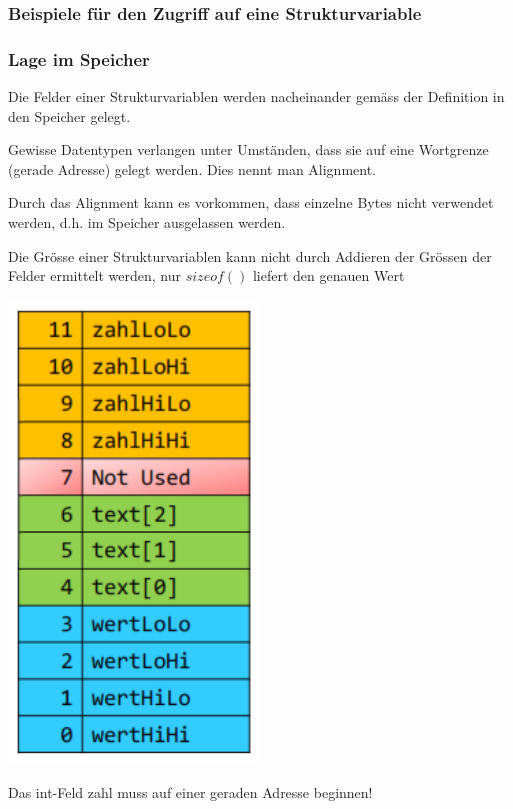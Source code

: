 		\subsubsection{Beispiele für den Zugriff auf eine Strukturvariable}
			\vspace*{-0.2cm}
			
			\vspace*{0.3cm}
		\begin{minipage}[c]{8 cm}
			\subsubsection{Lage im Speicher}
				\begin{compactitem}
					\item Die Felder einer Strukturvariablen werden nacheinander gemäss der Definition in den Speicher gelegt.
					\item Gewisse Datentypen verlangen unter Umständen, dass sie auf eine Wortgrenze (gerade Adresse) gelegt werden. Dies nennt man Alignment.
					\item Durch das Alignment kann es vorkommen, dass einzelne Bytes nicht verwendet werden, d.h. im Speicher ausgelassen werden.
					\item Die Grösse einer Strukturvariablen kann nicht durch Addieren der Grössen der Felder ermittelt werden, nur $sizeof()$ liefert den genauen Wert
				\end{compactitem}
		\end{minipage}
		\hspace*{2cm}
		\begin{minipage}[c]{7 cm}
			\includegraphics[width=0.5\textwidth]{pics/alignment.png}
		\end{minipage}
		\hspace*{-3cm}	
		\begin{minipage}[c]{3 cm}
			
			\vspace*{0.5cm}
			Das int-Feld zahl muss auf einer geraden Adresse beginnen!
		\end{minipage}
